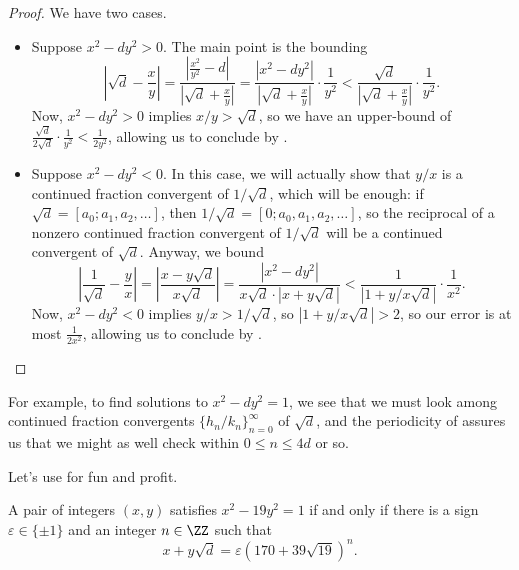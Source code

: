 \documentclass[../notes.tex]{subfiles}
\begin{document}
\begin{proof}
	We have two cases.
	\begin{itemize}
		\item Suppose $x^2-dy^2>0$. The main point is the bounding
		\[\left|\sqrt d-\frac xy\right|=\frac{\left|\frac{x^2}{y^2}-d\right|}{\left|\sqrt d+\frac xy\right|}=\frac{\left|x^2-dy^2\right|}{\left|\sqrt d+\frac xy\right|}\cdot\frac1{y^2}<\frac{\sqrt d}{\left|\sqrt d+\frac xy\right|}\cdot\frac1{y^2}.\]
		Now, $x^2-dy^2>0$ implies $x/y>\sqrt d$, so we have an upper-bound of $\frac{\sqrt d}{2\sqrt d}\cdot\frac1{y^2}<\frac1{2y^2}$, allowing us to conclude by .
		\item Suppose $x^2-dy^2<0$. In this case, we will actually show that $y/x$ is a continued fraction convergent of $1/\sqrt d$, which will be enough: if $\sqrt d=[a_0;a_1,a_2,\ldots]$, then $1/\sqrt d=[0;a_0,a_1,a_2,\ldots]$, so the reciprocal of a nonzero continued fraction convergent of $1/\sqrt d$ will be a continued convergent of $\sqrt d$. Anyway, we bound
		\[\left|\frac1{\sqrt d}-\frac yx\right|=\left|\frac{x-y\sqrt d}{x\sqrt d}\right|=\frac{\left|x^2-dy^2\right|}{x\sqrt d\cdot\left|x+y\sqrt d\right|}<\frac1{\left|1+y/x\sqrt d\right|}\cdot\frac1{x^2}.\]
		Now, $x^2-dy^2<0$ implies $y/x>1/\sqrt d$, so $\left|1+y/x\sqrt d\right|>2$, so our error is at most $\frac1{2x^2}$, allowing us to conclude by .
		\qedhere
	\end{itemize}
\end{proof}
\begin{remark}
	For example, to find solutions to $x^2-dy^2=1$, we see that we must look among continued fraction convergents $\{h_n/k_n\}_{n=0}^\infty$ of $\sqrt d$, and the periodicity of  assures us that we might as well check within $0\le n\le 4d$ or so.
\end{remark}
Let's use  for fun and profit.
\begin{example} \label{ex:find-unit-19}
	A pair of integers $(x,y)$ satisfies $x^2-19y^2=1$ if and only if there is a sign $\varepsilon\in\{\pm1\}$ and an integer $n\in\ZZ$ such that
	\[x+y\sqrt d=\varepsilon\left(170+39\sqrt{19}\right)^n.\]
\end{example}
\end{document}
